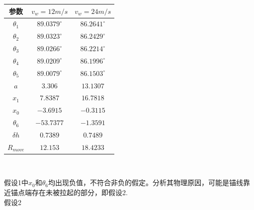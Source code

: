 \documentclass[a4paper,12pt]{ctexart}
\begin{document}
\begin{center}
\begin{tabular}{ccc}
\hline \hline
\multicolumn{1}{c}{参数}&\multicolumn{1}{c}{$v_w=12m/s$}&\multicolumn{1}{c}{$v_w=24m/s$}\\
\hline
$\theta_1$ & $89.0379^{\circ}$& $86.2641^{\circ}$\\
$\theta_2$ & $89.0323^{\circ}$&$86.2429^{\circ}$\\
$\theta_3$ & $89.0266^{\circ}$& $86.2214^{\circ}$\\
$\theta_4$ & $89.0209^{\circ}$& $86.1996^{\circ}$\\
$\theta_5$ & $89.0079^{\circ}$&$86.1503^{\circ}$\\
$a$ & $3.306$ & $13.1307$\\
$x_1$&$7.8387$&$16.7818$\\
$x_0$&$-3.6915$&$-0.3115$\\
$\theta_6$&$-53.7377$&$-1.3591$\\
$\delta h$&$0.7389$&$0.7489$\\
$R_{move}$&$12.153$&$18.4233$\\ \hline \hline
\end{tabular}\\
\end{center}
假设1中$x_0$和$\theta_6$均出现负值，不符合非负的假定。分析其物理原因，可能是锚线靠近锚点端存在未被拉起的部分，即假设2.\\

假设2
\end{document}
